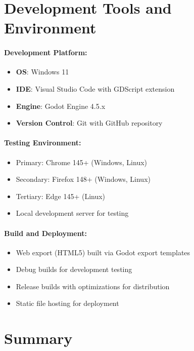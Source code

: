\section{Development Tools and Environment}
\label{sec:dev-environment}

\paragraph*{Development Platform:}
\begin{itemize}
    \item \textbf{OS}: Windows 11
    \item \textbf{IDE}: Visual Studio Code with GDScript extension
    \item \textbf{Engine}: Godot Engine 4.5.x
    \item \textbf{Version Control}: Git with GitHub repository
\end{itemize}

\paragraph*{Testing Environment:}
\begin{itemize}
    \item Primary: Chrome 145+ (Windows, Linux)
    \item Secondary: Firefox 148+ (Windows, Linux)
    \item Tertiary: Edge 145+ (Linux)
    \item Local development server for testing
\end{itemize}

\paragraph*{Build and Deployment:}
\begin{itemize}
    \item Web export (HTML5) built via Godot export templates
    \item Debug builds for development testing
    \item Release builds with optimizations for distribution
    \item Static file hosting for deployment
\end{itemize}

\section{Summary}
\label{sec:methodology-summary}

